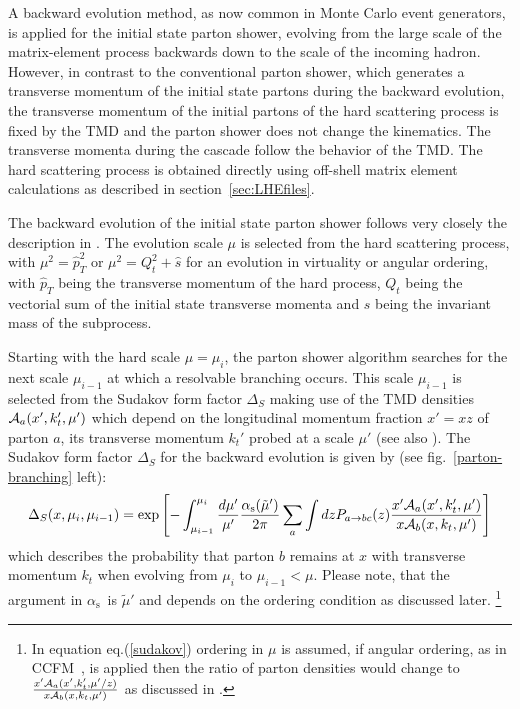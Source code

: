 \documentclass[11pt]{article} \usepackage{mystyle-new}
\newcommand{\cA}{{\cal A}}
\newcommand{\as}{\ensuremath{\alpha_\mathrm{s}}}
\def\prp{t}
\newcommand{\kt}{k_{t}}
\def\kt{\ensuremath{k_{\prp}}}
\newcommand{\ccfm}{Ciafaloni:1987ur,Catani:1989yc,Catani:1989sg,Marchesini:1994wr}
\begin{document}
A backward evolution method, as now common in Monte Carlo event generators, is applied for the initial state parton shower, evolving from the large scale of the matrix-element process backwards down to the scale of the incoming hadron. However, in contrast to the conventional parton shower, which generates a transverse momentum of the initial state partons during the backward evolution, the transverse momentum of the initial partons of the hard scattering process is fixed by the TMD and the parton shower does not change the kinematics.
The transverse momenta during the cascade follow the behavior of the TMD.  The hard scattering process is obtained directly using off-shell matrix element calculations as described in section~\ref{sec:LHEfiles}. 

The backward evolution of the initial state parton shower follows very closely the description in . The evolution scale $\mu$ is selected from the hard scattering process, with $\mu^2 = \hat{p}_T^2$  or $\mu^2 = Q_t^2 +\hat{s}$ for an evolution in virtuality or angular ordering, with $\hat{p}_T$ being the transverse momentum of the hard process, $Q_t$ being the vectorial sum of the initial state transverse momenta and $s$ being the invariant mass of the subprocess.  

Starting with the hard scale $\mu=\mu_{i}$, the  parton shower algorithm searches for the next scale $\mu_{i-1}$ at which a resolvable branching occurs. This scale $\mu_{i-1}$ is selected from the Sudakov form factor $\Delta_S$ making use of the TMD densities $\cA_a(x',\kt',\mu')$ which depend on the longitudinal momentum fraction $x'=x z$ of parton $a$, its transverse momentum $\kt'$ probed at a scale $\mu'$ (see also \cite{Jung:2010si}). The Sudakov form factor $\Delta_S$ for the backward evolution is given by (see fig.~\ref{parton-branching} left):
\begin{equation}
\Delta_S(x,\mu_{i},\mu_{i-1}) = \exp\left[ - \int_{\mu_{i-1}}^{\mu_{i}} \frac{d \mu'}{\mu'} \frac{\as({\tilde \mu'})}{2 \pi} \sum_a \int dz P_{a\to bc}(z) \frac{x'\cA_a(x',\kt',\mu')}{x\cA_b(x,\kt,\mu')} \right]
\label{sudakov}
\end{equation}
which describes the probability that parton $b$ remains at $x$ with transverse momentum $\kt$ when evolving from $\mu_i$ to $\mu_{i-1} < \mu$. Please note, that the argument in \as\ is $\tilde \mu'$ and depends on the ordering condition as discussed later.
\footnote{In equation eq.(\ref{sudakov}) ordering in $\mu$ is assumed, if  angular ordering, as in CCFM~\cite{\ccfm}, is applied then the ratio of parton densities would change to $ \frac{x'\cA_a(x',\kt',\mu'/z)}{x\cA_b(x,\kt,\mu')}$ as discussed in \cite{Jung:2010si}.}
\end{document}

